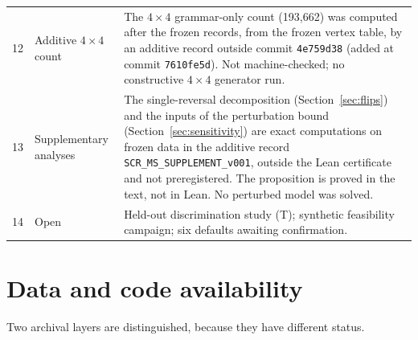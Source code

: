 \documentclass[11pt,a4paper]{article}
\theoremstyle{plain}
\theoremstyle{definition}
\theoremstyle{remark}
\newcommand{\lean}[1]{\nolinkurl{#1}}
\begin{document}
\begin{center}
\begin{tabularx}{\linewidth}{@{}p{0.7cm}p{3.3cm}X@{}}
12 & Additive $4\times4$ count & The $4\times4$ grammar-only count (193{,}662) was computed after the frozen records, from the frozen vertex table, by an additive record outside commit \texttt{4e759d38} (added at commit \texttt{7610fe5d}). Not machine-checked; no constructive $4\times4$ generator run.\\
13 & Supplementary analyses & The single-reversal decomposition (Section~\ref{sec:flips}) and the inputs of the perturbation bound (Section~\ref{sec:sensitivity}) are exact computations on frozen data in the additive record \lean{SCR_MS_SUPPLEMENT_v001}, outside the Lean certificate and not preregistered. The proposition is proved in the text, not in Lean. No perturbed model was solved.\\
14 & Open & Held-out discrimination study (T); synthetic feasibility campaign; six defaults awaiting confirmation.\\
\bottomrule
\end{tabularx}
\end{center}


\section*{Data and code availability}
\label{sec:availability}
Two archival layers are distinguished, because they have different status.
\end{document}
